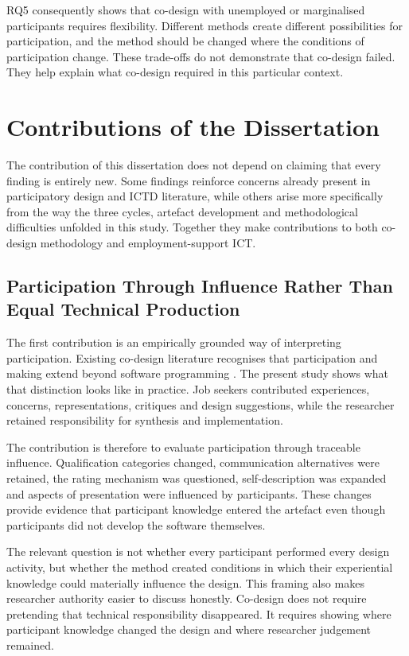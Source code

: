 RQ5 consequently shows that co-design with unemployed or marginalised participants requires flexibility. Different methods create different possibilities for participation, and the method should be changed where the conditions of participation change. These trade-offs do not demonstrate that co-design failed. They help explain what co-design required in this particular context.


\section{Contributions of the Dissertation}

The contribution of this dissertation does not depend on claiming that every finding is entirely new. Some findings reinforce concerns already present in participatory design and ICTD literature, while others arise more specifically from the way the three cycles, artefact development and methodological difficulties unfolded in this study. Together they make contributions to both co-design methodology and employment-support ICT.


\subsection{Participation Through Influence Rather Than Equal Technical Production}

The first contribution is an empirically grounded way of interpreting participation. Existing co-design literature recognises that participation and making extend beyond software programming \cite{sanders2008,sanders2014}. The present study shows what that distinction looks like in practice. Job seekers contributed experiences, concerns, representations, critiques and design suggestions, while the researcher retained responsibility for synthesis and implementation.

The contribution is therefore to evaluate participation through traceable influence. Qualification categories changed, communication alternatives were retained, the rating mechanism was questioned, self-description was expanded and aspects of presentation were influenced by participants. These changes provide evidence that participant knowledge entered the artefact even though participants did not develop the software themselves.

The relevant question is not whether every participant performed every design activity, but whether the method created conditions in which their experiential knowledge could materially influence the design. This framing also makes researcher authority easier to discuss honestly. Co-design does not require pretending that technical responsibility disappeared. It requires showing where participant knowledge changed the design and where researcher judgement remained.


